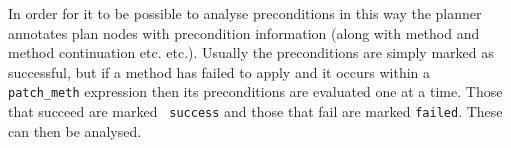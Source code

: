 In order for it to be possible to analyse
preconditions in this way the planner annotates
plan nodes with precondition information (along with method and method
continuation etc. etc.).
Usually the preconditions are simply marked as successful, but if a
method has failed to apply and it occurs within a {\tt
  patch\_meth} expression then its preconditions
are evaluated one at a time.  Those that succeed are marked {\tt
  success} and those that fail are marked {\tt failed}.  These can
then be analysed.

